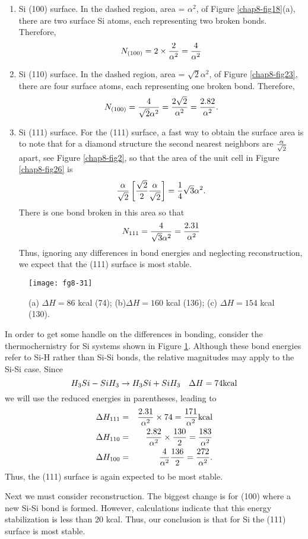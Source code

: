 \begin{enumerate}
\item Si (100) surface.  In the dashed region, area = 
$\alpha^2$, of Figure \ref{chap8-fig18}(a), there are two surface Si
atoms, each representing two broken bonds. Therefore,
\begin{equation}
N_{(100)} = 2 \times {2 \over \alpha^2} = {4 \over \alpha^2}
\end{equation}

\item Si (110) surface.  In the dashed region, area = 
$\sqrt{2}\alpha^2$, of Figure \ref{chap8-fig23}, there are four
surface atoms, each representing one broken bond. Therefore,
\begin{equation}
N_{(100)} = {4 \over \sqrt{2}\alpha^2} = {2 \sqrt{2} \over 
\alpha^2} = {2.82 \over \alpha^2}.
\end{equation}

\item Si (111) surface.  For the (111) surface, a fast way 
to obtain the surface area is to note that for a diamond structure the
second nearest neighbors are ${\alpha \over \sqrt{2}}$ apart, see
Figure \ref{chap8-fig2}, so that the area of the unit cell in Figure
\ref{chap8-fig26} is
\begin{equation}
{\alpha \over \sqrt{2}} \left[ {\sqrt{2} \over 2} {\alpha \over 
\sqrt{2}} \right] = {1 \over 4} \sqrt{3} \alpha^2 .
\end{equation}
There is one bond broken in this area so that
\begin{equation}
N_{111} = {4 \over \sqrt{3}\alpha^2} = {2.31 \over \alpha^2}
\end{equation} 
Thus, ignoring any differences in bond energies and neglecting 
reconstruction, we expect that the (111) surface is most stable.
\end{enumerate}


\begin{figure}
\begin{center}
\texttt{[image: fg8-31]}
\end{center}
\caption{(a) $\Delta H = 86$ kcal (74); (b)$\Delta H = 160$ kcal
(136); (c) $\Delta H = 154$ kcal (130).}
\label{chap8-fig31}
\end{figure}

In order to get some handle on the differences in bonding, consider
the thermochernistry for Si systems shown in Figure \ref{chap8-fig31}.
Although these bond energies refer to Si-H rather than Si-Si bonds,
the relative magnitudes may apply to the Si-Si case. Since
\begin{equation} 
H_3 Si - Si H_3 \rightarrow H_3 Si + Si H_3 ~~~ \Delta H = 74 {\rm 
kcal}
\end{equation} 
we will use the reduced energies in parentheses, leading to
\begin{eqnarray}
\Delta H_{111} &=& {2.31 \over \alpha^2} \times 74 = {171 \over 
\alpha^2} {\rm kcal}\cr
\Delta H_{110} &=& {2.82 \over \alpha^2} \times {130 \over 2} = {183 
\over \alpha^2}\cr
\Delta H_{100} &=& {4 \over \alpha^2} {136 \over 2} = {272 \over 
\alpha^2}.
\end{eqnarray}
Thus, the (111) surface is again expected to be most stable.

Next we must consider reconstruction. The biggest change is for (100) where 
a new Si-Si bond is formed.  However, calculations indicate that this energy 
stabilization is less than 20 kcal. Thus, our conclusion is that for 
Si the (111) surface is most stable.


